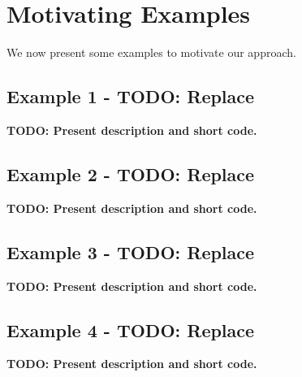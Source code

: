 \section{Motivating Examples}
\label{sec:motivation}

We now present some examples to motivate our approach.


\subsection{Example 1 - TODO: Replace}
\label{subsec:example1}

{\bf TODO: Present description and short code.}


\subsection{Example 2 - TODO: Replace}
\label{subsec:example2}

{\bf TODO: Present description and short code.}



\subsection{Example 3 - TODO: Replace}
\label{subsec:example3}

{\bf TODO: Present description and short code.}



\subsection{Example 4 - TODO: Replace}
\label{subsec:example4}

{\bf TODO: Present description and short code.}



